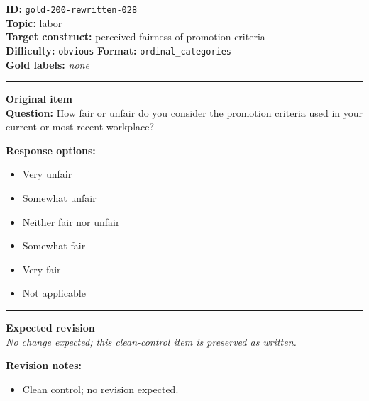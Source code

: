 \documentclass[10pt,a4paper]{article}
\newcommand{\sectionline}{\vspace{0.15em}\hrule\vspace{0.35em}}
\begin{document}
\begin{tcolorbox}[colframe=CleanGreen,colback=white,colbacktitle=CleanGreen!9,coltitle=black,title={Item 028\hfill Clean control}]
\textbf{ID:} \texttt{gold-200-rewritten-028}\\
\textbf{Topic:} labor\\
\textbf{Target construct:} perceived fairness of promotion criteria\\
\textbf{Difficulty:} \texttt{obvious} \quad \textbf{Format:} \texttt{ordinal\_categories}\\
\textbf{Gold labels:} \textit{none}\\
\sectionline
\textbf{Original item}\\
\textbf{Question:} How fair or unfair do you consider the promotion criteria used in your current or most recent workplace?
\par\textbf{Response options:}
\begin{itemize}
\item Very unfair
\item Somewhat unfair
\item Neither fair nor unfair
\item Somewhat fair
\item Very fair
\item Not applicable
\end{itemize}
\sectionline
\textbf{Expected revision}\\
\textit{No change expected; this clean-control item is preserved as written.}
\par\textbf{Revision notes:}
\begin{itemize}
\item Clean control; no revision expected.
\end{itemize}
\end{tcolorbox}
\end{document}

